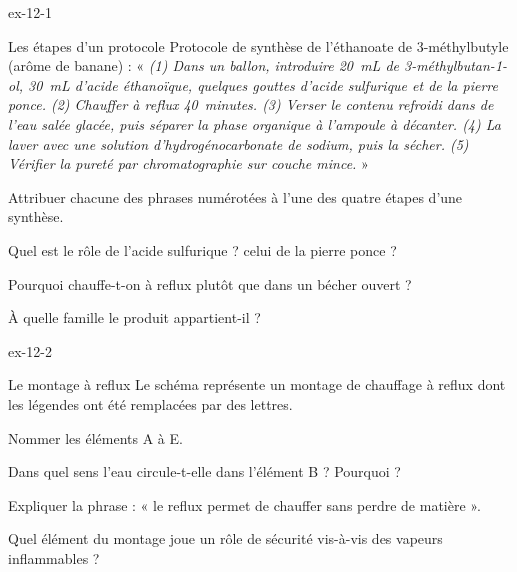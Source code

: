 \begin{blocLivre}{ex-12-1}
\begin{exercice}[1]{Les étapes d'un protocole}
Protocole de synthèse de l'éthanoate de 3-méthylbutyle (arôme de banane) : « \textit{(1) Dans un ballon, introduire
20~mL de 3-méthylbutan-1-ol, 30~mL d'acide éthanoïque, quelques gouttes d'acide sulfurique et de la pierre ponce.
(2) Chauffer à reflux 40~minutes. (3) Verser le contenu refroidi dans de l'eau salée glacée, puis séparer la phase
organique à l'ampoule à décanter. (4) La laver avec une solution d'hydrogénocarbonate de sodium, puis la sécher.
(5) Vérifier la pureté par chromatographie sur couche mince.} »
\begin{questions}
\item Attribuer chacune des phrases numérotées à l'une des quatre étapes d'une synthèse.
\item Quel est le rôle de l'acide sulfurique ? celui de la pierre ponce ?
\item Pourquoi chauffe-t-on à reflux plutôt que dans un bécher ouvert ?
\item À quelle famille le produit appartient-il ?
\end{questions}
\end{exercice}
\end{blocLivre}
\begin{blocLivre}{ex-12-2}
\begin{exercice}[1]{Le montage à reflux}
Le schéma représente un montage de chauffage à reflux dont les légendes ont été remplacées par des lettres.
\begin{questions}
\item Nommer les éléments A à E.
\item Dans quel sens l'eau circule-t-elle dans l'élément B ? Pourquoi ?
\item Expliquer la phrase : « le reflux permet de chauffer sans perdre de matière ».
\item Quel élément du montage joue un rôle de sécurité vis-à-vis des vapeurs inflammables ?
\end{questions}
\end{exercice}
\end{blocLivre}
